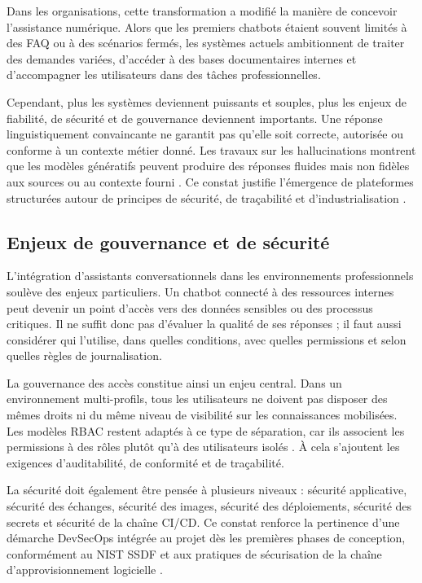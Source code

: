 Dans les organisations, cette transformation a modifié la manière de concevoir l’assistance numérique. Alors que les premiers chatbots étaient souvent limités à des FAQ ou à des scénarios fermés, les systèmes actuels ambitionnent de traiter des demandes variées, d’accéder à des bases documentaires internes et d’accompagner les utilisateurs dans des tâches professionnelles.

Cependant, plus les systèmes deviennent puissants et souples, plus les enjeux de fiabilité, de sécurité et de gouvernance deviennent importants. Une réponse linguistiquement convaincante ne garantit pas qu’elle soit correcte, autorisée ou conforme à un contexte métier donné. Les travaux sur les hallucinations montrent que les modèles génératifs peuvent produire des réponses fluides mais non fidèles aux sources ou au contexte fourni \cite{ji_hallucination_survey_2023}. Ce constat justifie l’émergence de plateformes structurées autour de principes de sécurité, de traçabilité et d’industrialisation \cite{nist_ai_rmf_2023,owasp_llm_top10_2025}.

\subsection{Enjeux de gouvernance et de sécurité}

L’intégration d’assistants conversationnels dans les environnements professionnels soulève des enjeux particuliers. Un chatbot connecté à des ressources internes peut devenir un point d’accès vers des données sensibles ou des processus critiques. Il ne suffit donc pas d’évaluer la qualité de ses réponses ; il faut aussi considérer qui l’utilise, dans quelles conditions, avec quelles permissions et selon quelles règles de journalisation.

La gouvernance des accès constitue ainsi un enjeu central. Dans un environnement multi-profils, tous les utilisateurs ne doivent pas disposer des mêmes droits ni du même niveau de visibilité sur les connaissances mobilisées. Les modèles RBAC restent adaptés à ce type de séparation, car ils associent les permissions à des rôles plutôt qu’à des utilisateurs isolés \cite{sandhu_rbac_1996}. À cela s’ajoutent les exigences d’auditabilité, de conformité et de traçabilité.

La sécurité doit également être pensée à plusieurs niveaux : sécurité applicative, sécurité des échanges, sécurité des images, sécurité des déploiements, sécurité des secrets et sécurité de la chaîne CI/CD. Ce constat renforce la pertinence d’une démarche DevSecOps intégrée au projet dès les premières phases de conception, conformément au NIST SSDF et aux pratiques de sécurisation de la chaîne d’approvisionnement logicielle \cite{nist_ssdf_800_218,slsa_spec_v1,ohm_supply_chain_attacks_2020}.

